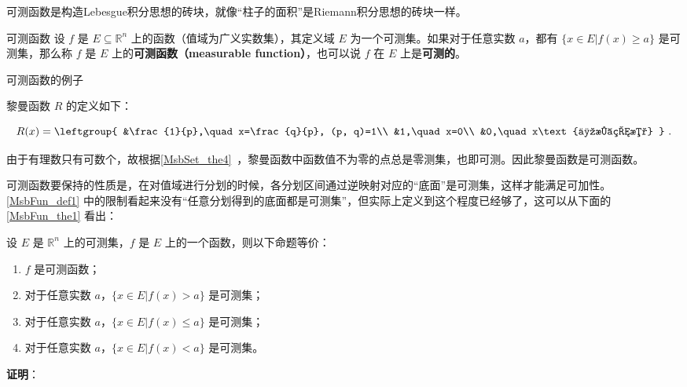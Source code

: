 可测函数是构造Lebesgue积分思想的砖块，就像“柱子的面积”是Riemann积分思想的砖块一样。

\begin{definition}{可测函数}\label{MsbFun_def1}
设 $f$ 是 $E\subseteq\mathbb{R}^n$ 上的函数（值域为广义实数集），其定义域 $E$ 为一个可测集。如果对于任意实数 $a$，都有 $\{x\in E|f(x)\geq a\}$ 是可测集，那么称 $f$ 是 $E$ 上的\textbf{可测函数（measurable function）}，也可以说 $f$ 在 $E$ 上是\textbf{可测的}。
\end{definition}

\begin{example}{可测函数的例子}

黎曼函数 $R$ 的定义如下：

\begin{equation}
R(x)=
\leftgroup{
        &\frac{1}{p},\quad x=\frac{q}{p}, (p, q)=1\\
        &1,\quad x=0\\
        &0,\quad x\text{为无理数}
}~.
\end{equation}

由于有理数只有可数个，故根据\autoref{MsbSet_the4}~，黎曼函数中函数值不为零的点总是零测集，也即可测。因此黎曼函数是可测函数。

\end{example}









可测函数要保持的性质是，在对值域进行分划的时候，各分划区间通过逆映射对应的“底面”是可测集，这样才能满足可加性。\autoref{MsbFun_def1} 中的限制看起来没有“任意分划得到的底面都是可测集”，但实际上定义到这个程度已经够了，这可以从下面的\autoref{MsbFun_the1} 看出：


\begin{theorem}{}\label{MsbFun_the1}
设 $E$ 是 $\mathbb{R}^n$ 上的可测集，$f$ 是 $E$ 上的一个函数，则以下命题等价：
\begin{enumerate}
\item $f$ 是可测函数；
\item 对于任意实数 $a$，$\{x\in E|f(x)>a\}$ 是可测集；
\item 对于任意实数 $a$，$\{x\in E|f(x)\leq a\}$ 是可测集；
\item 对于任意实数 $a$，$\{x\in E|f(x)<a\}$ 是可测集。
\end{enumerate}
\end{theorem}

\textbf{证明}：

